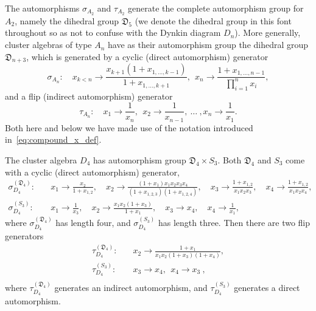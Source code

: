 \documentclass[11pt]{article}
\begin{document}
The automorphisms $\sigma_{A_2}$ and $\tau_{A_2}$ generate the complete automorphism group for $A_2$, namely the dihedral group ${\mathfrak D}_5$ (we denote the dihedral group in this font throughout so as not to confuse with the Dynkin diagram $D_n$). More generally, cluster algebras of type $A_n$ have as their automorphism group the dihedral group ${\mathfrak D}_{n+3}$, which is generated by a cyclic (direct automorphism) generator 
\begin{equation} \label{eq:def_An_automorphic_cycle}
  \sigma_{A_n}:\quad x_{k<n} \to \frac{x_{k+1}(1+x_{1,\ldots,k-1})}{1+x_{1,\ldots,k+1}},~~x_n\to\frac{1+x_{1,\ldots,n-1}}{\prod_{i=1}^n x_i} ,
\end{equation}
and a flip (indirect automorphism) generator
\begin{equation} \label{eq:def_An_automorphic_flip}
  \tau_{A_n}: \quad x_1 \to \frac{1}{x_n},~~x_2 \to \frac{1}{x_{n-1}},~\ldots~,x_n\to\frac{1}{x_1}.
\end{equation}
Both here and below we have made use of the notation introduced in~\eqref{eq:compound_x_def}.

The cluster algebra $D_4$ has automorphism group ${\mathfrak D}_4\times S_3$. Both ${\mathfrak D}_4$ and $S_3$ come with a cyclic (direct automorphism) generator,
\vspace{.1cm}
\begin{align}
  \sigma^{({\mathfrak D}_4)}_{D_4}:\quad& 
    x_1\to\frac{x_2}{1+x_{1,2}}, \quad
    x_2\to\frac{\left(1+x_1\right)x_1 x_2 x_3 x_4}{\left(1+x_{1,2,3}\right) \left(1+x_{1,2,4}\right)}, \quad
    x_3\to\frac{1+x_{1,2}}{x_1 x_2 x_3}, \quad
    x_4\to\frac{1+x_{1,2}}{x_1 x_2 x_4},\nonumber \\[2ex]
  \sigma^{(S_3)}_{D_4}:\quad& 
    x_1\to \frac{1}{x_3}, \quad
    x_2\to \frac{x_1 x_2 \left(1+x_3\right)}{1+x_1}, \quad
    x_3\to x_4, \quad
    x_4\to \frac{1}{x_1} ,
\end{align}
where $\sigma^{({\mathfrak D}_4)}_{D_4}$ has length four, and $\sigma^{(S_3)}_{D_4}$ has length three. Then there are two flip generators
\vspace{.1cm}
\begin{equation}
\begin{split}
  \tau^{({\mathfrak D}_4)}_{D_4}:\quad& 
    x_2\to \frac{1+x_1}{x_1 x_2 \left(1+x_3\right) \left(1+x_4\right)}, \\[2ex]
  \tau^{(S_3)}_{D_4}:\quad& 
    x_3\to x_4,~~
    x_4\to x_3 \ , \\[1ex]
\end{split}  
\end{equation}
where $\tau^{({\mathfrak D}_4)}_{D_4}$ generates an indirect automorphism, and $\tau^{(S_3)}_{D_4}$ generates a direct automorphism.
\end{document}
